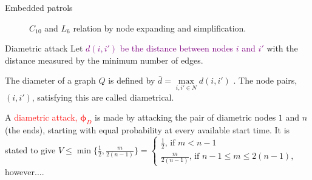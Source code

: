 \documentclass[11pt]{beamer}
\begin{document}
\begin{frame}{Embedded patrols}
\begin{figure}
\begin{center}
{
}
\end{center}
\caption{$C_{10}$ and $L_{6}$ relation by node expanding and simplification.}
\end{figure}
\end{frame}

\begin{frame}{Diametric attack}
Let \textcolor{purple}{$d(i,i')$ be the distance between nodes $i$ and $i'$} with the distance measured by the minimum number of edges.

\begin{definition}
The diameter of a graph $Q$ is defined by $\bar{d}=\max\limits_{i,i' \in N} d(i,i')$ . The node pairs, $(i,i')$, satisfying this are called diametrical.
\end{definition}

A \textcolor{red}{diametric attack, $\bm{\phi}_{D}$} is made by attacking the pair of diametric nodes $1$ and $n$ (the ends), starting with equal probability at every available start time. It is stated to give $V \leq \min\{\frac{1}{2},\frac{m}{2(n-1)}\}= \left\{
\begin{array}{l} 
\frac{1}{2} \text{, if } m<n-1 \\
\frac{m}{2(n-1)} \text{, if } n-1 \leq m \leq 2(n-1),
\end{array}
\right.$ however....
\end{frame}
\end{document}
